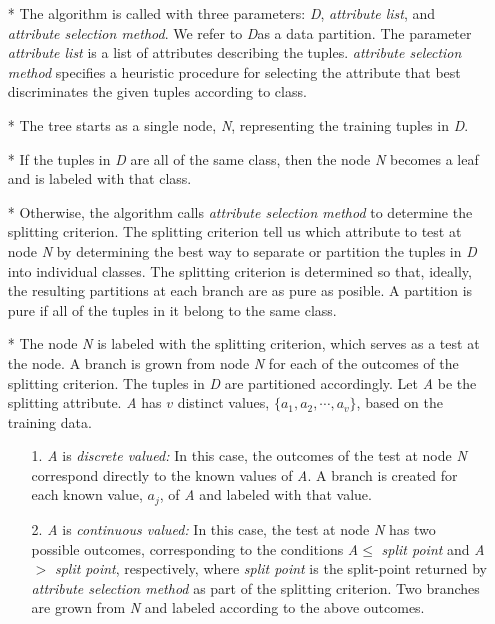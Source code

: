 \begin{itemize}
\item[*] The algorithm is called with three parameters: \textit{D}, \textit{attribute list}, and \textit{attribute selection method}. We refer to \textit{D}as a data partition.
The parameter \textit{attribute list} is a list of attributes describing the tuples.  \textit{attribute selection method} specifies a heuristic procedure for selecting the attribute that best discriminates the given tuples according to class.
\item[*] The tree starts as a single node, \textit{N}, representing the training tuples in \textit{D}.
\item[*] If the tuples in \textit{D} are all of the same class, then the node \textit{N} becomes a leaf and is labeled with that class.
\item[*] Otherwise, the algorithm calls \textit{attribute selection method} to determine the splitting criterion.  The splitting criterion tell us which attribute to test at node \textit{N} by determining the best way to separate or partition the tuples in \textit{D} into individual classes.  The splitting criterion is determined so that, ideally, the resulting partitions at each branch are as pure as posible.  A partition is pure if all of the tuples in it belong to the same class.
\item[*] The node \textit{N} is labeled with the splitting criterion, which serves as a test at the node. A branch is grown from node \textit{N} for each of the outcomes of the splitting criterion.  The tuples in \textit{D} are partitioned accordingly.  Let \textit{A} be the splitting attribute.  \textit{A} has $v$ distinct values, $\{a_{1}, a_ {2}, \cdots, a_{v}\}$, based on the training data.
\begin{itemize}
\item[1.] \textit{A} is \textit{discrete valued:} In this case, the outcomes of the test at node \textit{N} correspond directly to the known values of \textit{A}.  A branch is created for each known value, $a_{j}$, of \textit{A} and labeled with that value.
\item[2.] \textit{A} is \textit{continuous valued:} In this case, the test at node \textit{N} has two possible outcomes, corresponding to the conditions \textit{A}$\leq$ \textit{split point} and \textit{A} $>$ \textit{split point}, respectively, where \textit{split point} is the split-point returned by \textit{attribute selection method} as part of the splitting criterion.  Two branches are grown from \textit{N} and labeled according to the above outcomes.

\end{itemize}
\end{itemize}
